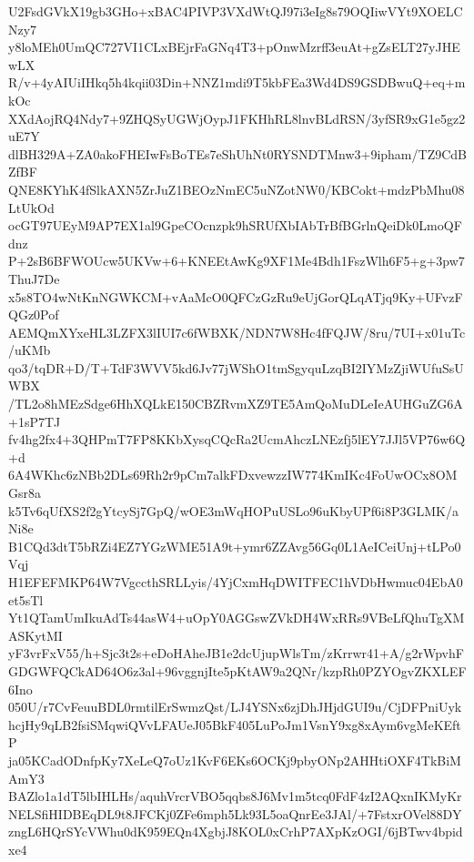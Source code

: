 U2FsdGVkX19gb3GHo+xBAC4PIVP3VXdWtQJ97i3eIg8s79OQIiwVYt9XOELCNzy7
y8loMEh0UmQC727VI1CLxBEjrFaGNq4T3+pOnwMzrff3euAt+gZsELT27yJHEwLX
R/v+4yAIUiIHkq5h4kqii03Din+NNZ1mdi9T5kbFEa3Wd4DS9GSDBwuQ+eq+mkOc
XXdAojRQ4Ndy7+9ZHQSyUGWjOypJ1FKHhRL8lnvBLdRSN/3yfSR9xG1e5gz2uE7Y
dlBH329A+ZA0akoFHEIwFsBoTEs7eShUhNt0RYSNDTMnw3+9ipham/TZ9CdBZfBF
QNE8KYhK4fSlkAXN5ZrJuZ1BEOzNmEC5uNZotNW0/KBCokt+mdzPbMhu08LtUkOd
ocGT97UEyM9AP7EX1al9GpeCOcnzpk9hSRUfXbIAbTrBfBGrlnQeiDk0LmoQFdnz
P+2sB6BFWOUcw5UKVw+6+KNEEtAwKg9XF1Me4Bdh1FszWlh6F5+g+3pw7ThuJ7De
x5s8TO4wNtKnNGWKCM+vAaMcO0QFCzGzRu9eUjGorQLqATjq9Ky+UFvzFQGz0Pof
AEMQmXYxeHL3LZFX3lIUI7c6fWBXK/NDN7W8Hc4fFQJW/8ru/7UI+x01uTc/uKMb
qo3/tqDR+D/T+TdF3WVV5kd6Jv77jWShO1tmSgyquLzqBI2IYMzZjiWUfuSsUWBX
/TL2o8hMEzSdge6HhXQLkE150CBZRvmXZ9TE5AmQoMuDLeIeAUHGuZG6A+1sP7TJ
fv4hg2fx4+3QHPmT7FP8KKbXysqCQcRa2UcmAhczLNEzfj5lEY7JJl5VP76w6Q+d
6A4WKhc6zNBb2DLs69Rh2r9pCm7alkFDxvewzzIW774KmIKc4FoUwOCx8OMGsr8a
k5Tv6qUfXS2f2gYtcySj7GpQ/wOE3mWqHOPuUSLo96uKbyUPf6i8P3GLMK/aNi8e
B1CQd3dtT5bRZi4EZ7YGzWME51A9t+ymr6ZZAvg56Gq0L1AeICeiUnj+tLPo0Vqj
H1EFEFMKP64W7VgccthSRLLyis/4YjCxmHqDWITFEC1hVDbHwmuc04EbA0et5sTl
Yt1QTamUmIkuAdTs44asW4+uOpY0AGGswZVkDH4WxRRs9VBeLfQhuTgXMASKytMI
yF3vrFxV55/h+Sjc3t2s+eDoHAheJB1e2dcUjupWlsTm/zKrrwr41+A/g2rWpvhF
GDGWFQCkAD64O6z3al+96vggnjIte5pKtAW9a2QNr/kzpRh0PZYOgvZKXLEF6Ino
050U/r7CvFeuuBDL0rmtilErSwmzQst/LJ4YSNx6zjDhJHjdGUI9u/CjDFPniUyk
hcjHy9qLB2fsiSMqwiQVvLFAUeJ05BkF405LuPoJm1VsnY9xg8xAym6vgMeKEftP
ja05KCadODnfpKy7XeLeQ7oUz1KvF6EKs6OCKj9pbyONp2AHHtiOXF4TkBiMAmY3
BAZlo1a1dT5lbIHLHs/aquhVrcrVBO5qqbs8J6Mv1m5tcq0FdF4zI2AQxnIKMyKr
NELSfiHIDBEqDL9t8JFCKj0ZFe6mph5Lk93L5oaQnrEe3JAl/+7FstxrOVel88DY
zngL6HQrSYcVWhu0dK959EQn4XgbjJ8KOL0xCrhP7AXpKzOGI/6jBTwv4bpidxe4
